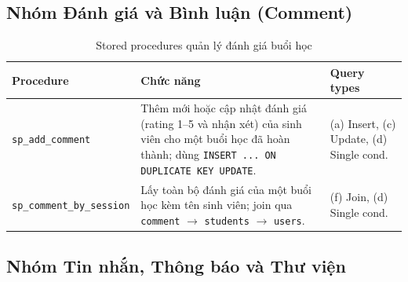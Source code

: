 \subsection{Nhóm Đánh giá và Bình luận (Comment)}

\begin{table}[H]
\centering
\caption{Stored procedures quản lý đánh giá buổi học}
\label{tab:sp_comment}
\small
\begin{tabular}{|p{4.5cm}|p{7.5cm}|p{2.5cm}|}
\hline
\textbf{Procedure} & \textbf{Chức năng} & \textbf{Query types} \\
\hline
\texttt{sp\_add\_comment} &
  Thêm mới hoặc cập nhật đánh giá (rating 1--5 và nhận xét) của sinh viên cho một buổi học đã hoàn thành; dùng \texttt{INSERT ... ON DUPLICATE KEY UPDATE}. &
  (a) Insert, (c) Update, (d) Single cond. \\
\hline
\texttt{sp\_comment\_by\_session} &
  Lấy toàn bộ đánh giá của một buổi học kèm tên sinh viên; join qua \texttt{comment} $\rightarrow$ \texttt{students} $\rightarrow$ \texttt{users}. &
  (f) Join, (d) Single cond. \\
\hline
\end{tabular}
\end{table}

\subsection{Nhóm Tin nhắn, Thông báo và Thư viện}


